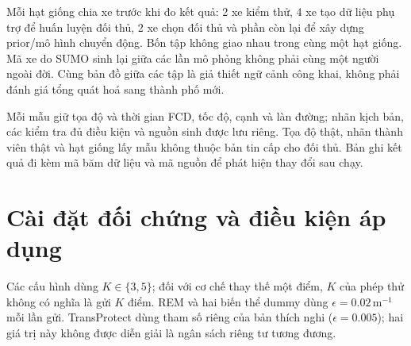 Mỗi hạt giống chia xe trước khi đo kết quả: 2 xe kiểm thử, 4 xe tạo dữ liệu phụ trợ để huấn luyện đối thủ, 2 xe chọn đối thủ và phần còn lại để xây dựng prior/mô hình chuyển động. Bốn tập không giao nhau trong cùng một hạt giống. Mã xe do SUMO sinh lại giữa các lần mô phỏng không phải cùng một người ngoài đời. Cùng bản đồ giữa các tập là giả thiết ngữ cảnh công khai, không phải đánh giá tổng quát hoá sang thành phố mới.

Mỗi mẫu giữ tọa độ và thời gian FCD, tốc độ, cạnh và làn đường; nhãn kịch bản, các kiểm tra đủ điều kiện và nguồn sinh được lưu riêng. Tọa độ thật, nhãn thành viên thật và hạt giống lấy mẫu không thuộc bản tin cấp cho đối thủ. Bản ghi kết quả đi kèm mã băm dữ liệu và mã nguồn để phát hiện thay đổi sau chạy.

\section{Cài đặt đối chứng và điều kiện áp dụng}

Các cấu hình dùng $K\in\{3,5\}$; đối với cơ chế thay thế một điểm, $K$ của phép thử không có nghĩa là gửi $K$ điểm. REM và hai biến thể dummy dùng $\epsilon=0.02\,\mathrm{m}^{-1}$ mỗi lần gửi. TransProtect dùng tham số riêng của bản thích nghi ($\epsilon=0.005$); hai giá trị này không được diễn giải là ngân sách riêng tư tương đương.

